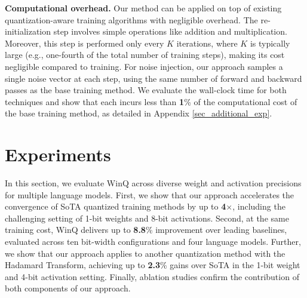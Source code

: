 \documentclass{article}
\theoremstyle{definition}
\newcommand{\acronym}{{\sc WinQ}}
\begin{document}
\textbf{Computational overhead.}
Our method can be applied on top of existing quantization-aware training algorithms with negligible overhead. 
The re-initialization step involves simple operations like addition and multiplication. Moreover, this step is performed only every $K$ iterations, where $K$ is typically large (e.g., one-fourth of the total number of training steps), making its cost negligible compared to training. 
For noise injection, our approach samples a single noise vector at each step, using the same number of forward and backward passes as the base training method. 
We evaluate the wall-clock time for both techniques and show that each incurs less than \textbf{1}\% of the computational cost of the base training method, as detailed in Appendix \ref{sec_additional_exp}. 





\section{Experiments}\label{sec_experiments}


In this section, we evaluate \acronym{} across diverse weight and activation precisions for multiple language models. First, we show that our approach accelerates the convergence of SoTA quantized training methods by up to \textbf{4}$\times$, including the challenging setting of 1-bit weights and 8-bit activations.   
Second, at the same training cost, \acronym{} delivers up to \textbf{8.8}\% improvement over leading baselines, evaluated across ten bit-width configurations and four language models. 
Further, we show that our approach applies to another quantization method with the Hadamard Transform, achieving up to \textbf{2.3}\% gains over SoTA in the 1-bit weight and 4-bit activation setting.
Finally, ablation studies confirm the contribution of both components of our approach.
\end{document}
